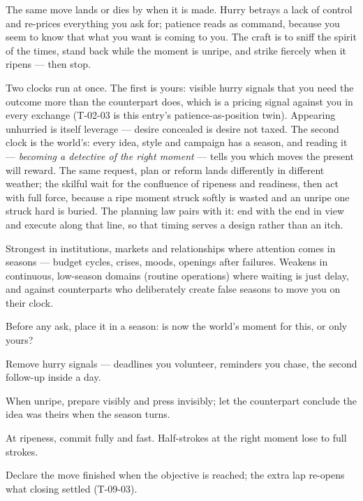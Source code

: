 \begin{core}
The same move lands or dies by when it is made. Hurry betrays a lack of control and re-prices everything you ask for; patience reads as command, because you seem to know that what you want is coming to you. The craft is to sniff the spirit of the times, stand back while the moment is unripe, and strike fiercely when it ripens --- then stop.
\end{core}
\begin{mechanism}
Two clocks run at once. The first is yours: visible hurry signals that you need the outcome more than the counterpart does, which is a pricing signal against you in every exchange (T-02-03 is this entry's patience-as-position twin). Appearing unhurried is itself leverage --- desire concealed is desire not taxed. The second clock is the world's: every idea, style and campaign has a season, and reading it --- \emph{becoming a detective of the right moment} --- tells you which moves the present will reward. The same request, plan or reform lands differently in different weather; the skilful wait for the confluence of ripeness and readiness, then act with full force, because a ripe moment struck softly is wasted and an unripe one struck hard is buried. The planning law pairs with it: end with the end in view and execute along that line, so that timing serves a design rather than an itch.
\end{mechanism}
\begin{conditions}
Strongest in institutions, markets and relationships where attention comes in seasons --- budget cycles, crises, moods, openings after failures. Weakens in continuous, low-season domains (routine operations) where waiting is just delay, and against counterparts who deliberately create false seasons to move you on their clock.
\end{conditions}
\begin{application}
  \item Before any ask, place it in a season: is now the world's moment for this, or only yours?
  \item Remove hurry signals --- deadlines you volunteer, reminders you chase, the second follow-up inside a day.
  \item When unripe, prepare visibly and press invisibly; let the counterpart conclude the idea was theirs when the season turns.
  \item At ripeness, commit fully and fast. Half-strokes at the right moment lose to full strokes.
  \item Declare the move finished when the objective is reached; the extra lap re-opens what closing settled (T-09-03).
\end{application}

